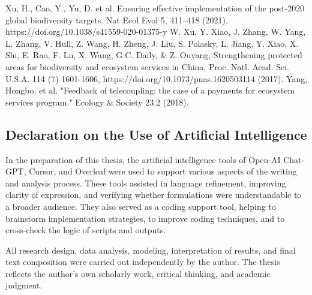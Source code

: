 \documentclass[12pt]{article}
\theoremstyle{break} %
\begin{document}
Xu, H., Cao, Y., Yu, D. et al. Ensuring effective implementation of the post-2020 global biodiversity targets. Nat Ecol Evol 5, 411–418 (2021). https://doi.org/10.1038/s41559-020-01375-y
\newline \newline
W. Xu, Y. Xiao, J. Zhang, W. Yang, L. Zhang, V. Hull, Z. Wang, H. Zheng, J. Liu, S. Polasky, L. Jiang, Y. Xiao, X. Shi, E. Rao, F. Lu, X. Wang, G.C. Daily, \& Z. Ouyang, Strengthening protected areas for biodiversity and ecosystem services in China, Proc. Natl. Acad. Sci. U.S.A. 114 (7) 1601-1606, https://doi.org/10.1073/pnas.1620503114 (2017).
\newline \newline
Yang, Hongbo, et al. "Feedback of telecoupling: the case of a payments for ecosystem services program." Ecology \& Society 23.2 (2018).
\newline \newline


\clearpage


\setcounter{table}{0}
\renewcommand\thetable{\Alph{section}.\arabic{table}}
\setcounter{equation}{0}
\renewcommand\theequation{\Alph{section}.\arabic{equation}}
\setcounter{figure}{0}
\renewcommand\thefigure{\Alph{section}.\arabic{figure}}

\begin{appendices}

\section{Declaration on the Use of Artificial Intelligence}
\label{declaration }
In the preparation of this thesis, the artificial intelligence tools of Open-AI Chat-GPT, Cursor, and Overleaf were used to support various aspects of the writing and analysis process. These tools assisted in language refinement, improving clarity of expression, and verifying whether formulations were understandable to a broader audience. They also served as a coding support tool, helping to brainstorm implementation strategies, to improve coding techniques, and to cross-check the logic of scripts and outputs.

All research design, data analysis, modeling, interpretation of results, and final text composition were carried out independently by the author. The thesis reflects the author’s own scholarly work, critical thinking, and academic judgment.
\end{appendices}
\end{document}
